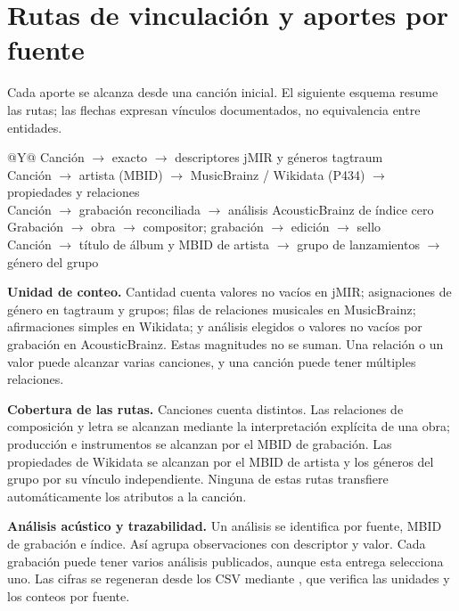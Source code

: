 \documentclass[11pt,a4paper]{article}
\begin{document}
\newpage
\section{Rutas de vinculación y aportes por fuente}
Cada aporte se alcanza desde una canción inicial. El siguiente esquema resume las rutas; las flechas expresan vínculos documentados, no equivalencia entre entidades.
\begin{center}\small
\begin{tabularx}{\linewidth}{@{}Y@{}}
\toprule
Canción $\rightarrow$  exacto $\rightarrow$ descriptores jMIR y géneros tagtraum \\
Canción $\rightarrow$ artista (MBID) $\rightarrow$ MusicBrainz / Wikidata (P434) $\rightarrow$ propiedades y relaciones \\
Canción $\rightarrow$ grabación reconciliada $\rightarrow$ análisis AcousticBrainz de índice cero \\
Grabación $\rightarrow$ obra $\rightarrow$ compositor; grabación $\rightarrow$ edición $\rightarrow$ sello \\
Canción $\rightarrow$ título de álbum y MBID de artista $\rightarrow$ grupo de lanzamientos $\rightarrow$ género del grupo \\
\bottomrule
\end{tabularx}
\end{center}


\textbf{Unidad de conteo.} Cantidad cuenta valores no vacíos en jMIR; asignaciones de género en tagtraum y grupos; filas de relaciones musicales en MusicBrainz; afirmaciones simples en Wikidata; y análisis elegidos o valores no vacíos por grabación en AcousticBrainz. Estas magnitudes no se suman. Una relación o un valor puede alcanzar varias canciones, y una canción puede tener múltiples relaciones.

\textbf{Cobertura de las rutas.} Canciones cuenta  distintos. Las relaciones de composición y letra se alcanzan mediante la interpretación explícita de una obra; producción e instrumentos se alcanzan por el MBID de grabación. Las propiedades de Wikidata se alcanzan por el MBID de artista y los géneros del grupo por su vínculo independiente. Ninguna de estas rutas transfiere automáticamente los atributos a la canción.

\textbf{Análisis acústico y trazabilidad.} Un análisis se identifica por fuente, MBID de grabación e índice. Así agrupa observaciones con descriptor y valor. Cada grabación puede tener varios análisis publicados, aunque esta entrega selecciona uno. Las cifras se regeneran desde los CSV mediante , que verifica las unidades y los conteos por fuente.
\end{document}
